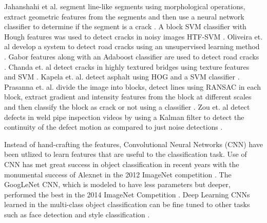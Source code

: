         
        Jahanshahi et al. segment line-like segments using morphological operations, extract geometric features from the segments and then use a neural network classifier to determine if the segment is a crack \cite{jahanshahi2013}. A block SVM classifier with Hough features was used to detect cracks in noisy images HTF-SVM \cite{Hu2010}. Oliveira et. al develop a system to detect road cracks using an unsupervised learning method \cite{Oliveira2014}. Gabor features along with an Adaboost classifier are used to detect road cracks \cite{Medina2014}. Chanda et. al  detect cracks in highly textured bridges using texture features and SVM \cite{chanda2014}. Kapela et. al. detect asphalt using HOG and a SVM classifier \cite{Kapela2015}. Prasanna et. al. divide the image into blocks, detect lines using RANSAC in each block, extract gradient and intensity features from the block at different scales and then classify the block as crack or not using a classifier \cite{Prasanna2014}. Zou et. al detect defects in weld pipe inspection videos by using a Kalman filter to detect the continuity of the defect motion as compared to just noise detections \cite{Zou2015}. 
    
        Instead of hand-crafting the features, Convolutional Neural Networks (CNN) have been utlized to learn features that are useful to the classification task. Use of CNN has met great success in object classification in recent years with the monumental success of Alexnet in the 2012 ImageNet competition . The GoogLeNet CNN, which is modeled to have less parameters but deeper, performed the best in the 2014 ImageNet Competition . Deep Learning CNNs learned in the multi-class object classification can be fine tuned to other tasks such as face detection  and style classification . 


